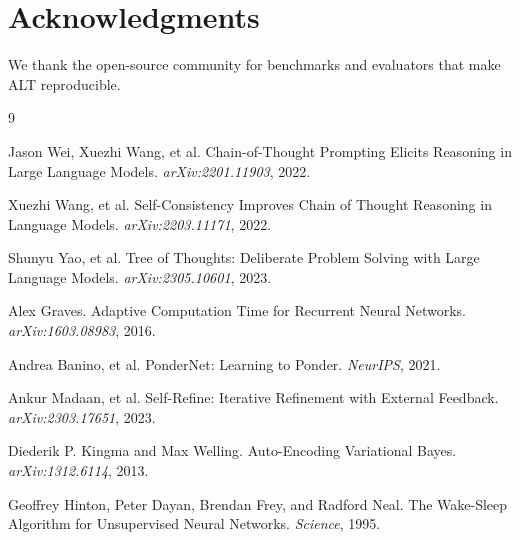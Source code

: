 \documentclass[11pt]{article}
\newcommand{\1}{\mathbf{1}}
\begin{document}
\section*{Acknowledgments}
We thank the open-source community for benchmarks and evaluators that make ALT reproducible.

\begin{thebibliography}{9}

Jason Wei, Xuezhi Wang, et al.
\newblock Chain-of-Thought Prompting Elicits Reasoning in Large Language Models.
\newblock \emph{arXiv:2201.11903}, 2022.

Xuezhi Wang, et al.
\newblock Self-Consistency Improves Chain of Thought Reasoning in Language Models.
\newblock \emph{arXiv:2203.11171}, 2022.

Shunyu Yao, et al.
\newblock Tree of Thoughts: Deliberate Problem Solving with Large Language Models.
\newblock \emph{arXiv:2305.10601}, 2023.

Alex Graves.
\newblock Adaptive Computation Time for Recurrent Neural Networks.
\newblock \emph{arXiv:1603.08983}, 2016.

Andrea Banino, et al.
\newblock PonderNet: Learning to Ponder.
\newblock \emph{NeurIPS}, 2021.

Ankur Madaan, et al.
\newblock Self-Refine: Iterative Refinement with External Feedback.
\newblock \emph{arXiv:2303.17651}, 2023.

Diederik P. Kingma and Max Welling.
\newblock Auto-Encoding Variational Bayes.
\newblock \emph{arXiv:1312.6114}, 2013.

Geoffrey Hinton, Peter Dayan, Brendan Frey, and Radford Neal.
\newblock The Wake-Sleep Algorithm for Unsupervised Neural Networks.
\newblock \emph{Science}, 1995.

\end{thebibliography}
\end{document}
